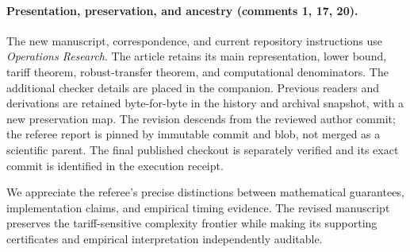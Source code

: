 \documentclass[11pt,letterpaper]{article}
\theoremstyle{definition}\newtheorem{remark}[theorem]{Remark}
\begin{document}
\paragraph{Presentation, preservation, and ancestry (comments 1, 17, 20).}
The new manuscript, correspondence, and current repository instructions use \emph{Operations Research}. The article retains its main representation, lower bound, tariff theorem, robust-transfer theorem, and computational denominators. The additional checker details are placed in the companion. Previous readers and derivations are retained byte-for-byte in the history and archival snapshot, with a new preservation map. The revision descends from the reviewed author commit; the referee report is pinned by immutable commit and blob, not merged as a scientific parent. The final published checkout is separately verified and its exact commit is identified in the execution receipt.

We appreciate the referee's precise distinctions between mathematical guarantees, implementation claims, and empirical timing evidence. The revised manuscript preserves the tariff-sensitive complexity frontier while making its supporting certificates and empirical interpretation independently auditable.
\end{document}

